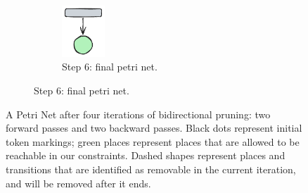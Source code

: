 \begin{figure}[htbp]
\begin{subfigure}[b]{0.23\textwidth}
		\vspace{0.5em}
		
		\begin{subfigure}[b]{\textwidth}
			\centering
			\includegraphics[width=0.23\textwidth]{plots/bidirectional_pruning_step_f_final.pdf}
			\caption{Step 6: final petri net.}\label{fig:step:f:bottom}
		\end{subfigure}
	\end{subfigure}
	
	\caption{A Petri Net after four iterations of bidirectional pruning: two forward passes and two backward passes. Black dots represent initial token markings; green places represent places that are allowed to be reachable in our constraints. Dashed shapes represent places and transitions that are identified as removable in the current iteration, and will be removed after it ends.}
	\label{fig:bidirectional_pruning}
\end{figure}




\newpage